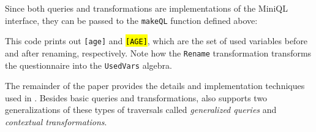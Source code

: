 Since both queries and transformations are implementations of the MiniQL interface, they can be passed to the \lstinline{makeQL} function defined above:

This code prints out  \lstinline{[age]} and \hl{\lstinline{[AGE]}}, which
are the set of used variables before and after renaming, respectively.
Note how the \lstinline{Rename} transformation transforms the questionnaire into the \lstinline{UsedVars} algebra.

The remainder of the paper provides the details and implementation
techniques used in \Name. Besides basic queries and transformations,
\name also supports two generalizations of these types of traversals
called \emph{generalized queries} and \emph{contextual transformations}.

